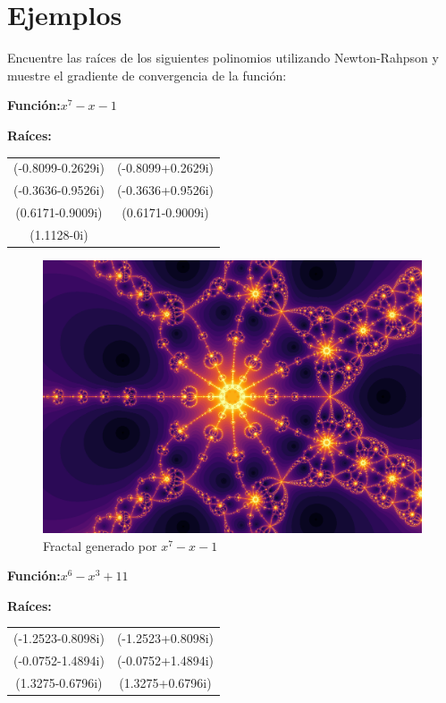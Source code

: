 \section{Ejemplos} 
Encuentre  las raíces de los siguientes polinomios utilizando Newton-Rahpson y muestre el gradiente de convergencia de la función:


\textbf{Función:}$x^7-x-1$

\textbf{Raíces:}

\begin{center}
\begin{tabular}{ c c }
 (-0.8099-0.2629i) & (-0.8099+0.2629i) \\
 (-0.3636-0.9526i) & (-0.3636+0.9526i) \\
 (0.6171-0.9009i) & (0.6171-0.9009i) \\  
 (1.1128-0i)  
\end{tabular}
\end{center}


\begin{figure}[H]
    \centering
    \includegraphics[scale=0.26]{images/ej1.png}
    \caption{Fractal generado por $x^7-x-1$}
    \label{fig:ej_1}
\end{figure}

\textbf{Función:}$x^6-x^3+11$

\textbf{Raíces:}

\begin{center}
\begin{tabular}{ c c }
 (-1.2523-0.8098i) & (-1.2523+0.8098i) \\
 (-0.0752-1.4894i) & (-0.0752+1.4894i) \\
 (1.3275-0.6796i) & (1.3275+0.6796i)
\end{tabular}
\end{center}


